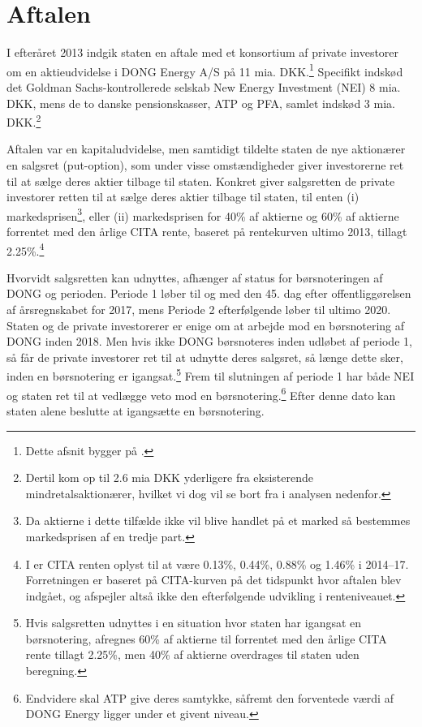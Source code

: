 \documentclass{article}
\begin{document}
\section{Aftalen}
I efteråret 2013 indgik staten en aftale med et konsortium af private investorer om en aktieudvidelse i DONG Energy A/S på 11 mia. DKK.\footnote{Dette afsnit bygger på \citet{FM2013a}.} Specifikt indskød det Goldman Sachs-kontrollerede selskab New Energy Investment (NEI) 8 mia. DKK, mens de to danske pensionskasser, ATP og PFA, samlet indskød 3 mia. DKK.\footnote{Dertil kom op til 2.6 mia DKK yderligere fra eksisterende mindretalsaktionærer, hvilket vi dog vil se bort fra i analysen nedenfor.}

Aftalen var en kapitaludvidelse, men samtidigt tildelte staten de nye aktionærer en salgsret (put-option), som under visse omstændigheder giver investorerne ret til at sælge deres aktier tilbage til staten. Konkret giver salgsretten de private investorer retten til at sælge deres aktier tilbage til staten,  til enten (i) markedsprisen\footnote{Da aktierne i dette tilfælde ikke vil blive handlet på et marked så bestemmes markedsprisen af en tredje part.}, eller (ii) markedsprisen for 40\% af aktierne og 60\% af aktierne forrentet med den årlige CITA rente, baseret på rentekurven ultimo 2013, tillagt 2.25\%.\footnote{I \citet{FM2013f} er CITA renten oplyst til at være 0.13\%, 0.44\%, 0.88\% og 1.46\% i 2014--17. Forretningen er baseret på CITA-kurven på det tidspunkt hvor aftalen blev indgået, og afspejler altså ikke den efterfølgende udvikling i renteniveauet.}

Hvorvidt salgsretten kan udnyttes, afhænger af status for børsnoteringen af DONG og perioden. Periode 1 løber til og med den 45. dag efter offentliggørelsen af årsregnskabet for 2017, mens Periode 2 efterfølgende løber til ultimo 2020. Staten og de private investorerer er enige om at arbejde mod en børsnotering af DONG inden 2018. Men hvis ikke DONG børsnoteres inden udløbet af periode 1, så får de private investorer ret til at udnytte deres salgsret, så længe dette sker, inden en børsnotering er igangsat.\footnote{Hvis salgsretten udnyttes i en situation hvor staten har igangsat en børsnotering, afregnes 60\% af aktierne til  forrentet med den årlige CITA rente tillagt 2.25\%, men 40\% af aktierne overdrages til staten uden beregning.} Frem til slutningen af periode 1 har både NEI og staten ret til at vedlægge veto mod en børsnotering.\footnote{Endvidere skal ATP give deres samtykke, såfremt den forventede værdi af DONG Energy ligger under et givent niveau.} Efter denne dato kan staten alene beslutte at igangsætte en børsnotering.
\end{document}
